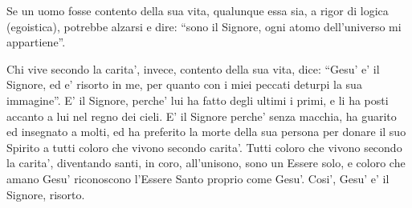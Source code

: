 %
\begin{vcentered}
    Se un uomo fosse contento della sua vita, qualunque essa sia, a rigor di logica (egoistica), potrebbe alzarsi e dire: ``sono il Signore, ogni atomo dell'universo mi appartiene''. 

    Chi vive secondo la carita', invece, contento della sua vita, dice: ``Gesu' e' il Signore, ed e' risorto in me, per quanto con i miei peccati deturpi la sua immagine''. E' il Signore, perche' lui ha fatto degli ultimi i primi, e li ha posti accanto a lui nel regno dei cieli. E' il Signore perche' senza macchia, ha guarito ed insegnato a molti, ed ha preferito la morte della sua persona per donare il suo Spirito a tutti coloro che vivono secondo carita'. Tutti coloro che vivono secondo la carita', diventando santi, in coro, all'unisono, sono un Essere solo, e coloro che amano Gesu' riconoscono l'Essere Santo proprio come Gesu'. Cosi', Gesu' e' il Signore, risorto.
\end{vcentered}


